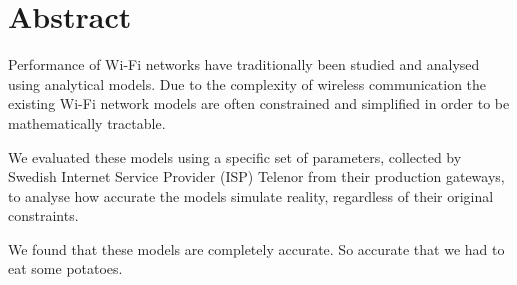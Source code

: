 \chapter*{Abstract}

Performance of Wi-Fi networks have traditionally been studied and analysed using analytical models. Due to the complexity of wireless communication the existing Wi-Fi network models are often constrained and simplified in order to be mathematically tractable.

We evaluated these models using a specific set of parameters, collected by Swedish Internet Service Provider (ISP) Telenor from their production gateways, to analyse how accurate the models simulate reality, regardless of their original constraints.\cite{bianchi}

We found that these models are completely accurate. So accurate that we had to eat some potatoes.